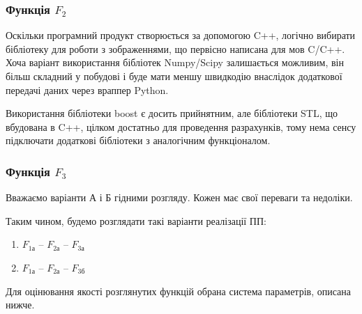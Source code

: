 \subsubsection{Функція $F_2$}
\label{subsub:economics_f2}
Оскільки програмний продукт створюється за допомогою C++, логічно вибирати бібліотеку для роботи з зображеннями, що первісно написана для мов C/C++. Хоча варіант використання бібліотек Numpy/Scipy залишається можливим, він більш складний у побудові і буде мати меншу швидкодію внаслідок додаткової передачі даних через враппер Python.

Використання бібліотеки boost є досить прийнятним, але бібліотеки STL, що вбудована в C++, цілком достатньо для проведення разрахунків, тому нема сенсу підключати додаткові бібліотеки з аналогічним функціоналом.
\subsubsection{Функція $F_3$}
Вважаємо варіанти А і Б гідними розгляду. Кожен має свої переваги та недоліки.

Таким чином, будемо розглядати такі варіанти реалізації ПП: 
\newcommand{\econf}[2]{F_{#1\text{#2} } }
\begin{enumerate}
	\item $\econf{1}{а}$ – $\econf{2}{а}$ – $\econf{3}{а}$
	\item $\econf{1}{а}$ – $\econf{2}{а}$ – $\econf{3}{б}$
\end{enumerate}
Для оцінювання якості розглянутих функцій обрана система параметрів, описана нижче.
